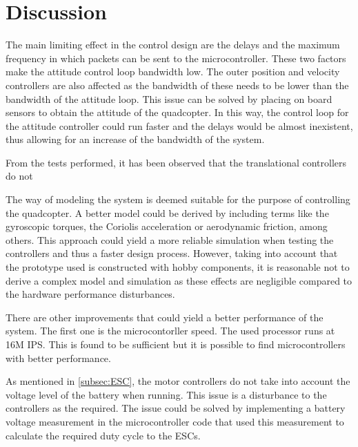 \chapter{Discussion}
The main limiting effect in the control design are the delays and the maximum frequency in which packets can be sent to the microcontroller. These two factors make the attitude control loop bandwidth low. The outer position and velocity controllers are also affected as the bandwidth of these needs to be lower than the bandwidth of the attitude loop. This issue can be solved by placing on board sensors to obtain the attitude of the quadcopter. In this way, the control loop for the attitude controller could run faster and the delays would be almost inexistent, thus allowing for an increase of the bandwidth of the system.

From the tests performed, it has been observed that the translational controllers do not 

The way of modeling the system is deemed suitable for the purpose of controlling the quadcopter. A better model could be derived by including terms like the gyroscopic torques, the Coriolis acceleration or aerodynamic friction, among others. This approach could yield a more reliable simulation when testing the controllers and thus a faster design process. However, taking into account that the prototype used is constructed with hobby components, it is reasonable not to derive a complex model and simulation as these effects are negligible compared to the hardware performance disturbances. 

There are other improvements that could yield a better performance of the system. The first one is the microcontorller speed. The used processor runs at 16M IPS. This is found to be sufficient but it is possible to find microcontrollers with better performance. 

As mentioned in \autoref{subsec:ESC}, the motor controllers do not take into account the voltage level of the battery when running. This issue is a disturbance to the controllers as the required. The issue could be solved by implementing a battery voltage measurement in the microcontroller code that used this measurement to calculate the required duty cycle to the ESCs.




